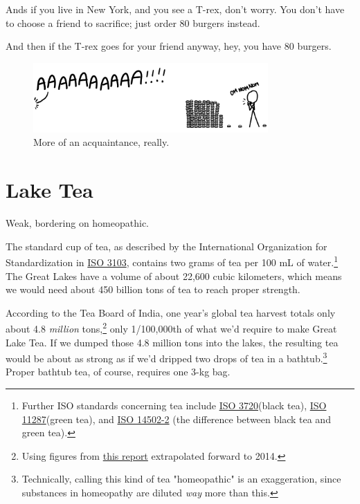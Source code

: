 {{Ands if you live in New York, and you see a T-rex, don't worry. You don't have to choose a friend to sacrifice; just order 80 burgers instead.}

{And then if the T-rex goes for your friend anyway, hey, you have 80 burgers.}

\begin{figure}[!htbp]
\centering
\includegraphics[scale=0.5, max width=0.8\textwidth]{imgs/a/78/trex_hamburgers.png}
\caption{More of an acquaintance, really.}
\end{figure}

{
\chapter{Lake Tea}
}

\hfill{}

{Weak, bordering on homeopathic.}

{The standard cup of tea, as described by the International Organization for Standardization in \href{http://www.iso.org/iso/catalogue\_detail.htm?csnumber=8250}{ISO 3103}, contains two grams of tea per 100 mL of water.{\footnote{Further ISO standards concerning tea include \href{http://www.iso.org/iso/catalogue\_detail.htm?csnumber=51541}{ISO 3720}(black tea), \href{http://www.iso.org/iso/catalogue\_detail.htm?csnumber=51540}{ISO 11287}(green tea), and \href{http://www.iso.org/iso/iso\_catalogue/catalogue\_tc/catalogue\_detail.htm?csnumber=31357}{ISO 14502-2} (the difference between black tea and green tea).} } The Great Lakes have a volume of about 22,600 cubic kilometers, which means we would need about 450 billion tons of tea to reach proper strength.}

{According to the Tea Board of India, one year's global tea harvest totals only about 4.8 \emph{million} tons,{\footnote{Using figures from \href{http://www.teaboard.gov.in/pdf/Tea\%20Statistics\%20Global\%20Scenario.pdf}{this report} extrapolated forward to 2014.} } only 1/100,000th of what we'd require to make Great Lake Tea. If we dumped those 4.8 million tons into the lakes, the resulting tea would be about as strong as if we'd dripped two drops of tea in a bathtub.{\footnote{Technically, calling this kind of tea "homeopathic" is an exaggeration, since substances in homeopathy are diluted \emph{way} more than this.} } Proper bathtub tea, of course, requires one 3-kg bag.}

}
